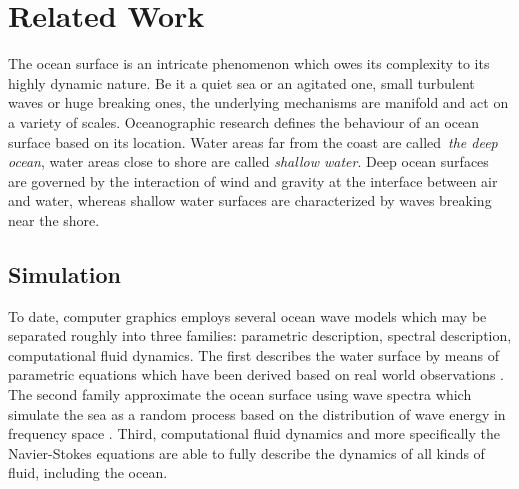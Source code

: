\chapter{Related Work}
\label{ch:state_of_the_art}
%
The ocean surface is an intricate phenomenon which owes its complexity
to its highly dynamic nature. Be it a quiet sea or an agitated one, small
turbulent waves or huge breaking ones, the underlying mechanisms are manifold
and act on a variety of scales. Oceanographic research defines the behaviour of
an ocean surface based on its location. Water areas far from the coast are
called~\emph{the deep ocean}, water areas close to shore are called
\emph{shallow water}. Deep ocean surfaces are governed by the interaction of
wind and gravity at the interface between air and water, whereas shallow water
surfaces are characterized by waves breaking near the shore.
%
\section{Simulation}
%
To date, computer graphics employs several ocean wave models which may be
separated roughly into three families: parametric description, spectral
description, computational fluid dynamics. The first describes the water surface
by means of parametric equations which have been derived based on real world
observations \citep{Gerstner:1809,Rankine:1863,Biesel:1952}.
The second family approximate the ocean surface using wave spectra which
simulate the sea as a random process based on the distribution of wave energy
in frequency space \citep{book:kinsman2002wind,article:PiersonMoskowitz1964,
article:Hasselman1973,article:Donelan1985,article:Elfouhaily1997}.
Third, computational fluid dynamics and more specifically the Navier-Stokes
equations are able to fully describe the dynamics of all kinds of fluid,
including the ocean.
%
